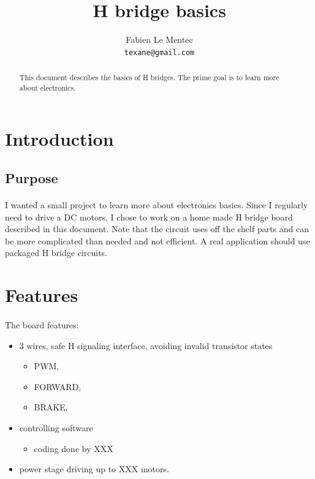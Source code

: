\documentclass[12pt]{article}
\title{H bridge basics}
\author{Fabien Le Mentec\\
\small \texttt{texane@gmail.com}
}
\date{}
\begin{document}
\maketitle

\begin{abstract}
This document describes the basics of H bridges. The prime goal is to learn more about electronics.
\end{abstract}


\newpage
\section{Introduction}

\subsection{Purpose}
\paragraph{} I wanted a small project to learn more about electronics basics. Since I regularly need to
drive a DC motors, I chose to work on a home made H bridge board described in this document. Note that
the circuit uses off the shelf parts and can be more complicated than needed and not efficient. A real
application should use packaged H bridge circuits.


\newpage
\section{Features}
\paragraph{} The board features:
\begin{itemize}
  \item 3 wires, safe H signaling interface, avoiding invalid transistor states
    \begin{itemize}
      \item PWM,
      \item FORWARD,
      \item BRAKE.
    \end{itemize}
  \item controlling software
    \begin{itemize}
      \item coding done by XXX
    \end{itemize}
  \item power stage driving up to XXX motors.
\end{itemize}
\end{document}
